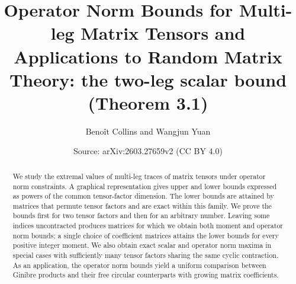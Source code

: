 \documentclass[10pt,a4paper]{amsart}
\title[Operator norm bounds for multi-leg matrix tensors]{Operator Norm Bounds for Multi-leg Matrix Tensors and Applications to Random Matrix Theory: the two-leg scalar bound (Theorem 3.1)}
\author[Benoît Collins and Wangjun Yuan]{Benoît Collins and Wangjun Yuan}
\date{Source: arXiv:2603.27659v2 (CC BY 4.0)}
\numberwithin{equation}{section}
\theoremstyle{plain}
\begin{document}
\begin{abstract}
We study the extremal values of multi-leg traces of matrix tensors under operator norm constraints. A graphical representation gives upper and lower bounds expressed as powers of the common tensor-factor dimension. The lower bounds are attained by matrices that permute tensor factors and are exact within this family. We prove the bounds first for two tensor factors and then for an arbitrary number. Leaving some indices uncontracted produces matrices for which we obtain both moment and operator norm bounds; a single choice of coefficient matrices attains the lower bounds for every positive integer moment. We also obtain exact scalar and operator norm maxima in special cases with sufficiently many tensor factors sharing the same cyclic contraction. As an application, the operator norm bounds yield a uniform comparison between Ginibre products and their free circular counterparts with growing matrix coefficients.
\end{abstract}
\end{document}
